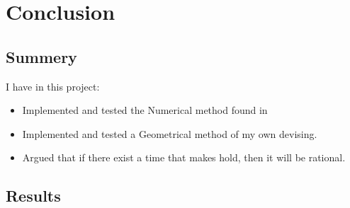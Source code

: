 

\section{Conclusion}
\label{conclusion}

\subsection{Summery}

I have in this project:
\begin{itemize}
\item Implemented and tested the Numerical method found in \cite{invis}
\item Implemented and tested a Geometrical method of my own devising.
\item Argued that if there exist a time that makes  hold, then it will be rational.
\end{itemize}

\subsection{Results}


